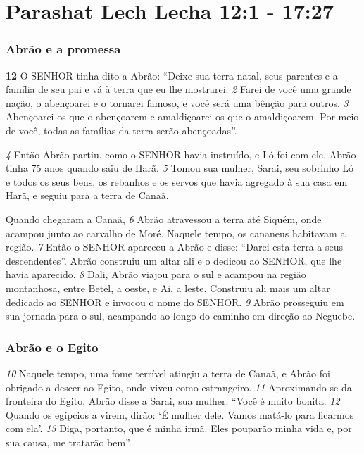 \section*{Parashat Lech Lecha 12:1 - 17:27}

\subsubsection*{Abrão e a promessa}
\textbf{\large 12}
 O SENHOR tinha dito a Abrão: “Deixe sua terra natal, seus parentes e a
família de seu pai e vá à terra que eu lhe mostrarei. 
\textit{\tiny 2}
Farei de você uma grande
nação, o abençoarei e o tornarei famoso, e você será uma bênção para outros.
\textit{\tiny 3}
Abençoarei os que o abençoarem e amaldiçoarei os que o amaldiçoarem. Por
meio de você, todas as famílias da terra serão abençoadas”.

\bigskip
\textit{\tiny 4}
Então Abrão partiu, como o SENHOR havia instruído, e Ló foi com ele. Abrão
tinha 75 anos quando saiu de Harã. 
\textit{\tiny 5}
Tomou sua mulher, Sarai, seu sobrinho Ló e
todos os seus bens, os rebanhos e os servos que havia agregado à sua casa em
Harã, e seguiu para a terra de Canaã. 

\bigskip
Quando chegaram a Canaã, 
\textit{\tiny 6}
Abrão
atravessou a terra até Siquém, onde acampou junto ao carvalho de Moré. Naquele
tempo, os cananeus habitavam a região.
\textit{\tiny 7}
Então o SENHOR apareceu a Abrão e disse: “Darei esta terra a seus
descendentes”. Abrão construiu um altar ali e o dedicou ao SENHOR, que lhe havia
aparecido. 
\textit{\tiny 8}
Dali, Abrão viajou para o sul e acampou na região montanhosa, entre
Betel, a oeste, e Ai, a leste. Construiu ali mais um altar dedicado ao SENHOR e
invocou o nome do SENHOR. 
\textit{\tiny 9}
Abrão prosseguiu em sua jornada para o sul,
acampando ao longo do caminho em direção ao Neguebe.

\bigskip
\subsubsection*{Abrão e o Egito}
\textit{\tiny 10}
Naquele tempo, uma fome terrível atingiu a terra de Canaã, e Abrão foi
obrigado a descer ao Egito, onde viveu como estrangeiro. 
\textit{\tiny 11}
Aproximando-se da
fronteira do Egito, Abrão disse a Sarai, sua mulher: “Você é muito bonita.
\textit{\tiny 12}
Quando os egípcios a virem, dirão: ‘É mulher dele. Vamos matá-lo para ficarmos
com ela’. 
\textit{\tiny 13}
Diga, portanto, que é minha irmã. Eles pouparão minha vida e, por sua
causa, me tratarão bem”.

